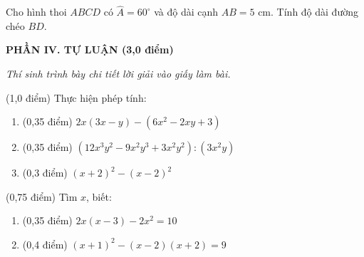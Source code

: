 \documentclass[12pt,a4paper]{article}
\begin{document}
\begin{ex}
Cho hình thoi $ABCD$ có $\widehat{A} = 60^\circ$ và độ dài cạnh $AB = 5\text{ cm}$. Tính độ dài đường chéo $BD$. 
\end{ex}


\setcounter{ex}{0}
\noindent\textbf{\large PHẦN IV. TỰ LUẬN (3,0 điểm)}

\textit{Thí sinh trình bày chi tiết lời giải vào giấy làm bài.}

\vspace{1mm}
\begin{ex} (1,0 điểm)
Thực hiện phép tính:
\begin{enumerate}[label=\textbf{\alph*)}, leftmargin=0.8cm, itemsep=2pt]
\item (0,35 điểm) $2x(3x - y) - (6x^2 - 2xy + 3)$
\item (0,35 điểm) $(12x^3y^2 - 9x^2y^3 + 3x^2y^2) : (3x^2y)$
\item (0,3 điểm) $(x + 2)^2 - (x - 2)^2$
\end{enumerate}
\end{ex}
\vspace{0.5mm}

\begin{ex} (0,75 điểm)
Tìm $x$, biết:
\begin{enumerate}[label=\textbf{\alph*)}, leftmargin=0.8cm, itemsep=2pt]
\item (0,35 điểm) $2x(x - 3) - 2x^2 = 10$
\item (0,4 điểm) $(x + 1)^2 - (x - 2)(x + 2) = 9$
\end{enumerate}
\end{ex}
\vspace{0.5mm}
\end{document}

